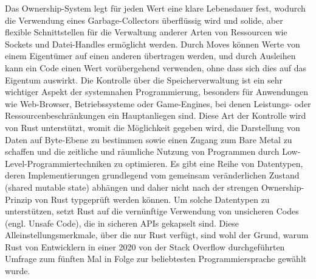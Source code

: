 Das Ownership-System legt für jeden Wert eine klare Lebensdauer fest, wodurch die Verwendung eines Garbage-Collectors überflüssig wird und solide, aber flexible Schnittstellen für die Verwaltung anderer Arten von Ressourcen wie Sockets und Datei-Handles ermöglicht werden. Durch \glqq Moves\grqq{} können Werte von einem Eigentümer auf einen anderen übertragen werden, und durch Ausleihen kann ein Code einen Wert vorübergehend verwenden, ohne dass sich dies auf das Eigentum auswirkt. 
Die Kontrolle über die Speicherverwaltung ist ein sehr wichtiger Aspekt der systemnahen Programmierung, besonders für Anwendungen wie Web-Browser, Betriebssysteme oder Game-Engines, bei denen Leistungs- oder Ressourcenbeschränkungen ein Hauptanliegen sind. Diese Art der Kontrolle wird von Rust unterstützt, womit die Möglichkeit gegeben wird, die Darstellung von Daten auf Byte-Ebene zu bestimmen sowie einen Zugang zum \glqq Bare Metal\grqq{} zu schaffen und die zeitliche und räumliche Nutzung von Programmen durch Low-Level-Programmiertechniken zu optimieren.
Es gibt eine Reihe von Datentypen, deren Implementierungen grundlegend vom gemeinsam veränderlichen Zustand (shared mutable state) abhängen und daher nicht nach der strengen Ownership-Prinzip von Rust typgeprüft werden können. Um solche Datentypen zu unterstützen, setzt Rust auf die vernünftige Verwendung von unsicheren Codes (engl. Unsafe Code), die in sicheren APIs gekapselt sind.
Diese Alleinstellungsmerkmale, über die nur Rust verfügt, sind wohl der Grund, warum Rust von Entwicklern in einer 2020 von der Stack Overflow durchgeführten Umfrage zum fünften Mal in Folge zur beliebtesten Programmiersprache gewählt wurde. 



